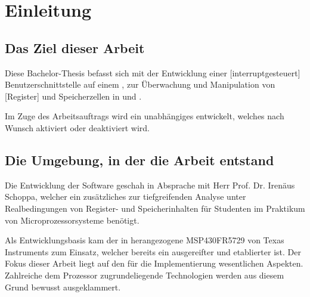 
\chapter{Einleitung}
\label{cha:Einleitung}


\section{Das Ziel dieser Arbeit}
\label{sec:ZielDerArbeit}

Diese Bachelor-Thesis befasst sich mit der Entwicklung einer [interruptgesteuert] Benutzerschnittstelle auf einem , zur \"Uberwachung und Manipulation von [Register] und Speicherzellen in  und .

Im Zuge des Arbeitsauftrags wird ein unabh\"angiges  entwickelt, welches nach Wunsch aktiviert oder deaktiviert wird.


\section{Die Umgebung, in der die Arbeit entstand}
\label{sec:EntstehungsUmgebungArbeit}

Die Entwicklung der Software geschah in Absprache mit Herr Prof. Dr. Iren\"aus Schoppa, welcher ein zus\"atzliches  zur tiefgreifenden Analyse unter Realbedingungen von Register- und Speicherinhalten f\"ur Studenten im Praktikum von Microprozessorsysteme ben\"otigt.

Als Entwicklungsbasis kam der in  herangezogene MSP430FR5729 von Texas Instruments zum Einsatz, welcher bereits ein ausgereifter und etablierter  ist. Der Fokus dieser Arbeit liegt auf den f\"ur die Implementierung wesentlichen Aspekten. Zahlreiche dem Prozessor zugrundeliegende Technologien werden aus diesem Grund bewusst ausgeklammert. 


